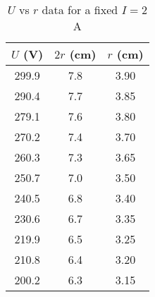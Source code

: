 \begin{table}[H]
\centering
\begin{tabular}{|c|c|c|} \hline
    $U$ (V)& $2r$ (cm) & $r$ (cm)  \\ \hline
    299.9 & 7.8 & 3.90  \\
    290.4 & 7.7 & 3.85 \\
    279.1 & 7.6 & 3.80 \\
    270.2 & 7.4 & 3.70  \\
    260.3 & 7.3 & 3.65 \\
    250.7 & 7.0 & 3.50  \\
    240.5 & 6.8 & 3.40  \\
    230.6 & 6.7 & 3.35 \\
    219.9 & 6.5 & 3.25 \\
    210.8 & 6.4 & 3.20  \\
    200.2 & 6.3 & 3.15 \\
    \hline
    \end{tabular}    
    \caption{$U$ vs $r$ data for a fixed $I=2$ A}
    \label{tab:3}
\end{table}